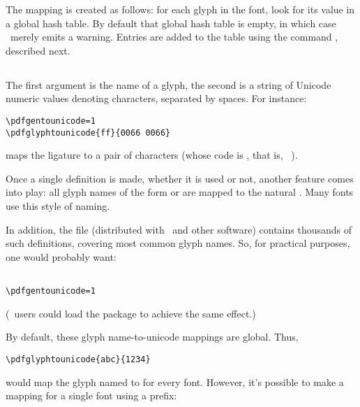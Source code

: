 \documentclass{pdftexmanual}
\begin{document}
The mapping is created as follows: for each glyph in the font, look for
its  value in a global hash table. By default that
global hash table is empty, in which case \PDFTEX\ merely emits a
warning. Entries are added to the table using the command
, described next.

\subsection{}

The first argument is the name of a glyph, the second is a string of Unicode
numeric values denoting characters, separated by spaces. For instance:

\begin{verbatim}
\pdfgentounicode=1
\pdfglyphtounicode{ff}{0066 0066}
\end{verbatim}

\noindent maps the  ligature to a pair of  characters
(whose code is , that is, \ASCII\ ).

Once a single  definition is made, whether it is
used or not, another feature comes into play: all glyph names of the
form  or  are mapped to the natural
. Many fonts use this style of naming.

In addition, the  file (distributed with
\PDFTEX\ and other software) contains thousands of such definitions,
covering most common glyph names. So, for practical purposes, one would
probably want:

\begin{verbatim}

\pdfgentounicode=1
\end{verbatim}

\noindent (\LATEX\ users could load the  package to achieve
the same effect.)

By default, these glyph name-to-unicode mappings are global. Thus,

\begin{verbatim}
\pdfglyphtounicode{abc}{1234}
\end{verbatim}

\noindent would map the glyph named  to  for
every font. However, it's possible to make a mapping for a single font
using a  prefix:
\end{document}
